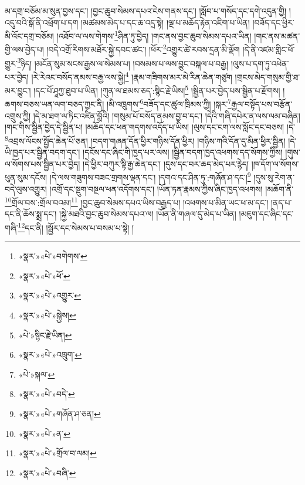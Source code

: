 མ་དགྲ་བཅོམ་མ་སུན་བྱས་དང་། །བྱང་ཆུབ་སེམས་དཔའ་ངེས་གནས་དང་། །སློབ་པ་གསོད་དང་དགེ་འདུན་གྱི། །འདུ་བའི་སྒོ་ནི་འཕྲོག་པ་དག །མཚམས་མེད་པ་དང་ཆ་འདྲ་སྟེ། །ལྔ་པ་མཆོད་རྟེན་འཇིག་པ་ཡིན། །བཟོད་དང་ཕྱིར་མི་འོང་དགྲ་བཅོམ། །འཐོབ་ལ་ལས་གེགས་\footnote{«སྣར་»«པེ་»བགེགས་}ཤིན་ཏུ་བྱེད། །གང་ནས་བྱང་ཆུབ་སེམས་དཔའ་ཡིན། །གང་ནས་མཚན་གྱི་ལས་བྱེད་པ། །བདེ་འགྲོ་རིགས་མཐོར་སྐྱེ་དབང་ཚང་། །ཕོར་\footnote{«སྣར་»«པེ་»ཕོ་}འགྱུར་ཚེ་རབས་དྲན་མི་ལྡོག །དེ་ནི་འཛམ་གླིང་ཕོ་གྱུར་\footnote{«སྣར་»«པེ་»འགྱུར་}ཉིད། །མངོན་སུམ་སངས་རྒྱས་ལ་སེམས་པ། །བསམས་པ་ལས་བྱུང་བསྐལ་པ་བརྒྱ། །ལུས་པ་དག་ཏུ་འཕེན་པར་བྱེད། །རེ་རེའང་བསོད་ནམས་བརྒྱ་ལས་སྐྱེ།\footnote{«སྣར་»«པེ་»སྐྱེས།} །རྣམ་གཟིགས་མར་མེ་རིན་ཆེན་གཙུག །གྲངས་མེད་གསུམ་གྱི་ཐ་མར་བྱུང་། །དང་པོ་ཤཱཀྱ་ཐུབ་པ་ཡིན། །ཀུན་ལ་ཐམས་ཅད་:སྙིང་རྗེ་ཡིས།\footnote{«པེ་»སྙིང་རྗེ་ཡིན།} །སྦྱིན་པར་བྱེད་པས་སྦྱིན་པ་རྫོགས། །ཆགས་བཅས་ཡན་ལག་བཅད་ཀྱང་ནི། །མི་འཁྲུགས་\footnote{«སྣར་»«པེ་»འཁྲུག་}བཟོད་དང་ཚུལ་ཁྲིམས་ཀྱི། །སྐར་\footnote{«པེ་»སྐལ་}རྒྱལ་བསྟོད་པས་བརྩོན་འགྲུས་ཀྱི། །དེ་མ་ཐག་ལ་ཏིང་འཛིན་བློའི། །གསུམ་པོ་བསོད་ནམས་བྱ་བ་དང་། །དེའི་གཞི་དཔེར་ན་ལས་ལམ་བཞིན། །གང་གིས་སྦྱིན་བྱེད་དེ་སྦྱིན་པ། །མཆོད་དང་ཕན་གདགས་འདོད་པ་ཡིས། །ལུས་དང་ངག་ལས་སློང་དང་བཅས། །དེ་\footnote{«སྣར་»«པེ་»བདེ་}འབྲས་ལོངས་སྤྱོད་ཆེན་པོ་ཅན། །བདག་གཞན་དོན་ཕྱིར་གཉིས་དོན་ཕྱིར། །གཉིས་ཀའི་དོན་དུ་མིན་ཕྱིར་སྦྱིན། །དེ་ཡི་ཁྱད་པར་སྦྱིན་བདག་དང་། །དངོས་དང་ཞིང་གི་ཁྱད་པར་ལས། །སྦྱིན་བདག་ཁྱད་འཕགས་དད་སོགས་ཀྱིས། །གུས་ལ་སོགས་པས་སྦྱིན་པར་བྱེད། །དེ་ཕྱིར་བཀུར་སྟི་རྒྱ་ཆེན་དང་། །དུས་དང་བར་ཆད་མེད་པར་རྙེད། །ཁ་དོག་ལ་སོགས་ཕུན་སུམ་དངོས། །དེ་ལས་གཟུགས་བཟང་གྲགས་ལྡན་དང་། །དགའ་དང་ཤིན་ཏུ་:གཞོན་ཤ་དང་།\footnote{«སྣར་»«པེ་»གཞོན་ཤ་ཅན།} །དུས་སུ་རེག་ན་བདེ་ལུས་འགྱུར། །འགྲོ་དང་སྡུག་བསྔལ་ཕན་འདོགས་དང་། །ཡོན་ཏན་རྣམས་ཀྱིས་ཞིང་ཁྱད་འཕགས། །མཆོག་ནི་\footnote{«སྣར་»«པེ་»ན་}གྲོལ་བས་:གྲོལ་བའམ།\footnote{«སྣར་»«པེ་»གྲོལ་བ་ལམ།} །བྱང་ཆུབ་སེམས་དཔའ་ཡིས་བརྒྱད་པ། །འཕགས་པ་མིན་ཡང་ཕ་མ་དང་། །ནད་པ་དང་ནི་ཆོས་སྨྲ་དང་། །སྐྱེ་མཐའི་བྱང་ཆུབ་སེམས་དཔའ་ལ། །ཡོན་ནི་གཞལ་དུ་མེད་པ་ཡིན། །མཇུག་དང་ཞིང་དང་གཞི་\footnote{«སྣར་»«པེ་»བཞི་}དང་ནི། །སྦྱོར་དང་སེམས་པ་བསམ་པ་སྟེ། །
